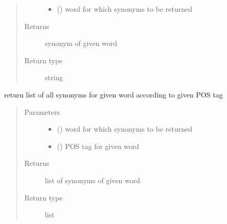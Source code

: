 \documentclass[letterpaper,10pt,english]{sphinxmanual}
\begin{document}
\begin{fulllineitems}
\begin{fulllineitems}
\begin{quote}
\begin{description}
\begin{itemize}
\item {} 
 () \textendash{} word for which synonyms to be returned

\end{itemize}

\item[{Returns}] \leavevmode
synonym of given word

\item[{Return type}] \leavevmode
string

\end{description}\end{quote}

\end{fulllineitems}


\begin{fulllineitems}
\label{\detokenize{ParaphraseDatasetCreation.Hindi:ParaphraseDatasetCreation.Hindi.Positive.Positive_Paraphrases.get_synonyms}}
return list of all synonyms for given word according to given POS tag
\begin{quote}\begin{description}
\item[{Parameters}] \leavevmode\begin{itemize}
\item {} 
 () \textendash{} word for which synonyms to be returned

\item {} 
 () \textendash{} POS tag for given word

\end{itemize}

\item[{Returns}] \leavevmode
list of synonyms of given word

\item[{Return type}] \leavevmode
list

\end{description}\end{quote}


\end{fulllineitems}
\end{fulllineitems}
\end{document}
